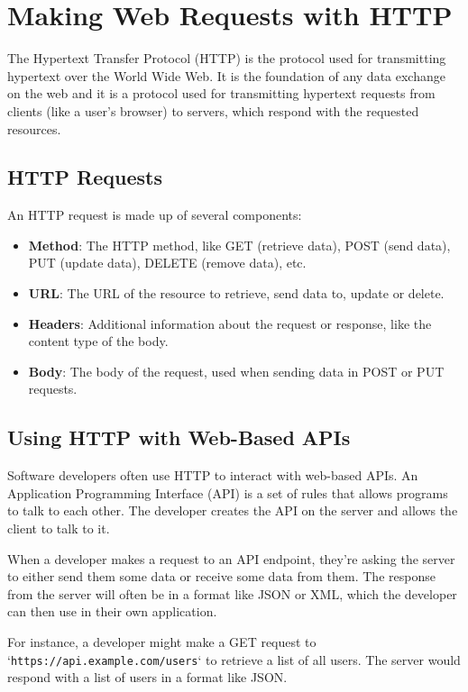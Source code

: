 \chapter{Making Web Requests with HTTP}

The Hypertext Transfer Protocol (HTTP) is the protocol used for
transmitting hypertext over the World Wide Web. It is the foundation
of any data exchange on the web and it is a protocol used for
transmitting hypertext requests from clients (like a user's browser)
to servers, which respond with the requested resources.

\section{HTTP Requests}

An HTTP request is made up of several components:

\begin{itemize}
    \item \textbf{Method}: The HTTP method, like GET (retrieve data), POST (send data), PUT (update data), DELETE (remove data), etc.
    \item \textbf{URL}: The URL of the resource to retrieve, send data to, update or delete.
    \item \textbf{Headers}: Additional information about the request or response, like the content type of the body.
    \item \textbf{Body}: The body of the request, used when sending data in POST or PUT requests.
\end{itemize}

\section{Using HTTP with Web-Based APIs}

Software developers often use HTTP to interact with web-based APIs. An
Application Programming Interface (API) is a set of rules that allows
programs to talk to each other. The developer creates the API on the
server and allows the client to talk to it.

When a developer makes a request to an API endpoint, they're asking
the server to either send them some data or receive some data from
them. The response from the server will often be in a format like JSON
or XML, which the developer can then use in their own application.

For instance, a developer might make a GET request to
`\texttt{https://api.example.com/users}` to retrieve a list of all
users. The server would respond with a list of users in a format like
JSON.


